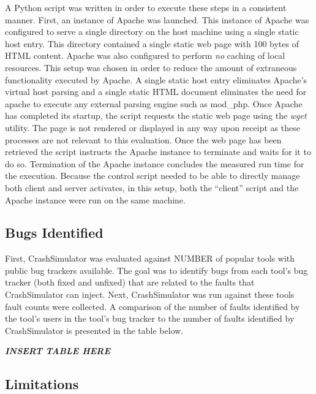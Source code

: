                 A Python script was written in order to execute these steps in a consistent manner. First, an instance
                of Apache was launched. This instance of Apache was configured to serve a single directory on the host
                machine using a single static host entry. This directory contained a single static web page with 100
                bytes of HTML content. Apache was also configured to perform \emph{no} caching of local resources. This
                setup was chosen in order to reduce the amount of extraneous functionality executed by Apache. A single
                static host entry eliminates Apache's virtual host parsing and a single static HTML document eliminates
                the need for apache to execute any external parsing engine such as mod\_php. Once Apache has completed
                its startup, the script requests the static web page using the \emph{wget} utility. The page is not
                rendered or displayed in any way upon receipt as these processes are not relevant to this evaluation.
                Once the web page has been retrieved the script instructs the Apache instance to terminate and waits for
                it to do so. Termination of the Apache instance concludes the measured run time for the execution.
                Because the control script needed to be able to directly manage both client and server activates, in
                this setup, both the ``client'' script and the Apache instance were run on the same machine.



    \subsection{Bugs Identified}

    First, CrashSimulator was evaluated against NUMBER of popular tools with public bug trackers available. The goal was
    to identify bugs from each tool's bug tracker (both fixed and unfixed) that are related to the faults that
    CrashSimulator can inject. Next, CrashSimulator was run against these tools fault counts were collected. A
    comparison of the number of faults identified by the tool's users in the tool's bug tracker to the number of faults
    identified by CrashSimulator is presented in the table below.

    \emph{\textbf{INSERT TABLE HERE}}

    \subsection{Limitations}

